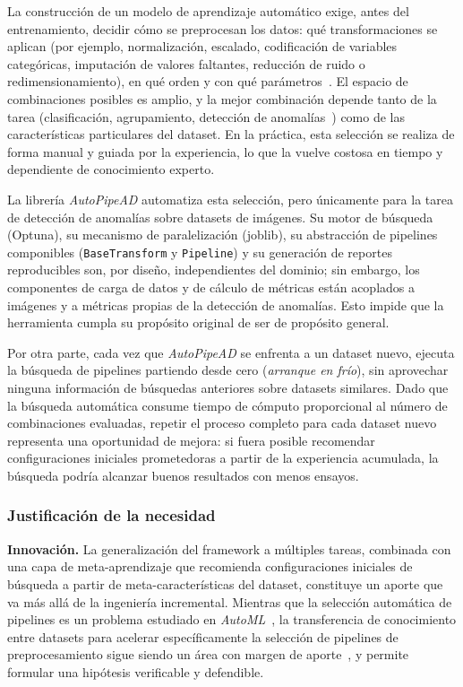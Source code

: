 \documentclass[12pt,letterpaper]{article}
\begin{document}
La construcción de un modelo de aprendizaje automático exige, antes del entrenamiento, decidir cómo se preprocesan los datos: qué transformaciones se aplican (por ejemplo, normalización, escalado, codificación de variables categóricas, imputación de valores faltantes, reducción de ruido o redimensionamiento), en qué orden y con qué parámetros~\cite{garcia2015preprocessing}. El espacio de combinaciones posibles es amplio, y la mejor combinación depende tanto de la tarea (clasificación, agrupamiento, detección de anomalías~\cite{chandola2009anomaly}) como de las características particulares del dataset. En la práctica, esta selección se realiza de forma manual y guiada por la experiencia, lo que la vuelve costosa en tiempo y dependiente de conocimiento experto.

La librería \textit{AutoPipeAD} automatiza esta selección, pero únicamente para la tarea de detección de anomalías sobre datasets de imágenes. Su motor de búsqueda (Optuna), su mecanismo de paralelización (joblib), su abstracción de pipelines componibles (\texttt{BaseTransform} y \texttt{Pipeline}) y su generación de reportes reproducibles son, por diseño, independientes del dominio; sin embargo, los componentes de carga de datos y de cálculo de métricas están acoplados a imágenes y a métricas propias de la detección de anomalías. Esto impide que la herramienta cumpla su propósito original de ser de propósito general.

Por otra parte, cada vez que \textit{AutoPipeAD} se enfrenta a un dataset nuevo, ejecuta la búsqueda de pipelines partiendo desde cero (\textit{arranque en frío}), sin aprovechar ninguna información de búsquedas anteriores sobre datasets similares. Dado que la búsqueda automática consume tiempo de cómputo proporcional al número de combinaciones evaluadas, repetir el proceso completo para cada dataset nuevo representa una oportunidad de mejora: si fuera posible recomendar configuraciones iniciales prometedoras a partir de la experiencia acumulada, la búsqueda podría alcanzar buenos resultados con menos ensayos.

\subsubsection{Justificación de la necesidad}

\textbf{Innovación.} La generalización del framework a múltiples tareas, combinada con una capa de meta-aprendizaje que recomienda configuraciones iniciales de búsqueda a partir de meta-características del dataset, constituye un aporte que va más allá de la ingeniería incremental. Mientras que la selección automática de pipelines es un problema estudiado en \textit{AutoML}~\cite{hutter2019automl}, la transferencia de conocimiento entre datasets para acelerar específicamente la selección de pipelines de preprocesamiento sigue siendo un área con margen de aporte~\cite{brazdil2009metalearning}, y permite formular una hipótesis verificable y defendible.
\end{document}
